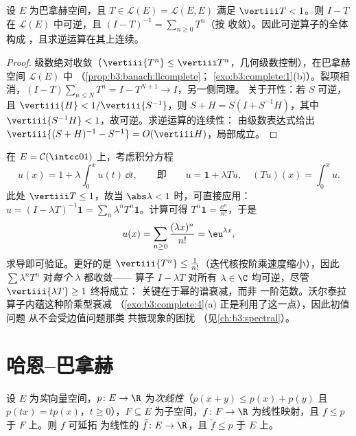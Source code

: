 \begin{proposition}[诺伊曼级数]\label{prop:b3:banach:neumann}
设 $E$ 为巴拿赫空间，且 $T \in \mathcal L(E) = \mathcal L(E,E)$
满足 $\vertiii T < 1$。则 $I - T$ 在 $\mathcal
L(E)$ 中可逆，且 $(I - T)^{-1} = \sum_{n\geq0}T^n$（按
收敛）。因此可逆算子的全体构成
，且求逆运算在其上连续。
\end{proposition}

\begin{proof}
级数绝对收敛（$\vertiii{T^n} \leq \vertiii
T^n$，几何级数控制），在巴拿赫空间 $\mathcal L(E)$ 中
（\cref{prop:b3:banach:llcomplete}；
\cref{exo:b3:complete:1}(b)）。裂项相消，$(I - T)\sum_{n \leq
N}T^n = I - T^{N+1} \to I$，另一侧同理。
关于开性：若 $S$ 可逆，且 $\vertiii{H} <
1/\vertiii{S^{-1}}$，则 $S + H = S(I + S^{-1}H)$，其中
$\vertiii{S^{-1}H} < 1$，故可逆。求逆运算的连续性：
由级数表达式给出 $\vertiii{(S+H)^{-1} - S^{-1}} =
O(\vertiii H)$，局部成立。
\end{proof}

\begin{example}
\label{ex:b3:banach:volterraexample}
在 $E = \mathcal C(\intcc01)$ 上，考虑积分方程
\[
u(x) = 1 + \lambda\int_0^xu(t)\,\dd t,
\qquad\text{即}\qquad u = \mathbf 1 + \lambda Tu,
\quad (Tu)(x) = \int_0^xu .
\]
此处 $\vertiii T \leq 1$，故当 $\abs\lambda < 1$ 时，可直接应用：$u = (I - \lambda T)^{-1}\mathbf 1 =
\sum_n\lambda^nT^n\mathbf 1$。计算可得 $T^n\mathbf 1 =
\frac{x^n}{n!}$，于是
\[
u(x) = \sum_{n\geq0}\frac{(\lambda x)^n}{n!} =
\eu^{\lambda x} ,
\]
求导即可验证。更好的是 $\vertiii{T^n} \leq
\frac1{n!}$（迭代核按阶乘速度缩小），因此
$\sum\lambda^nT^n$ 对\emph{每个} $\lambda$ 都收敛——
算子 $I - \lambda T$ 对所有 $\lambda
\in \C$ 均可逆，尽管 $\vertiii{\lambda T} \geq 1$ 终将成立：
关键在于幂的谱衰减，而非
一阶范数。沃尔泰拉算子内蕴这种阶乘型衰减
（\cref{exo:b3:complete:4}(a) 正是利用了这一点），因此初值问题
从不会受边值问题那类
共振现象的困扰
（见\cref{ch:b3:spectral}）。
\end{example}

\section{哈恩--巴拿赫}

\begin{theorem}
\label{thm:b3:banach:hahnbanach}
设 $E$ 为\emph{实}向量空间，$p \colon E \to \R$
为\emph{次线性}（$p(x + y) \leq p(x) + p(y)$ 且 $p(tx) =
tp(x)$，$t \geq 0$），$F \subseteq E$ 为子空间，$f
\colon F \to \R$ 为线性映射，且 $f \leq p$ 于 $F$ 上。则 $f$ 可延拓
为线性的 $\tilde f \colon E \to \R$，且 $\tilde f \leq p$
于 $E$ 上。
\end{theorem}

